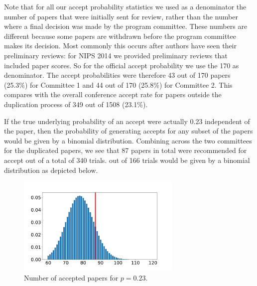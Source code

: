 Note that for all our accept probability statistics we used as a
denominator the number of papers that were initially sent for review,
rather than the number where a final decision was made by the program
committee. These numbers are different because some papers are withdrawn
before the program committee makes its decision. Most commonly this
occurs after authors have seen their preliminary reviews: for NIPS 2014
we provided preliminary reviews that included paper scores. So for the
official accept probability we use the 170 as denominator. The accept
probabilities were therefore 43 out of 170 papers (25.3\%) for Committee
1 and 44 out of 170 (25.8\%) for Committee 2. This compares with the
overall conference accept rate for papers outside the duplication
process of 349 out of 1508 (23.1\%).

If the true underlying probability of an accept were actually 0.23
independent of the paper, then the probability of generating accepts for
any subset of the papers would be given by a binomial distribution.
Combining across the two committees for the duplicated papers, we see
that 87 papers in total were recommended for accept out of a total of
340 trials. out of 166 trials would be given by a binomial distribution
as depicted below.

\begin{Shaded}
\begin{Highlighting}[]
\end{Highlighting}
\end{Shaded}

\begin{figure}[htb]
\includegraphics[width=0.70\textwidth]{diagrams/neurips/uncertainty-accept-rate.pdf}


\caption{Number of accepted papers for $p=0.23$.}
\label{uncertainty-accept-rate}
\end{figure}

